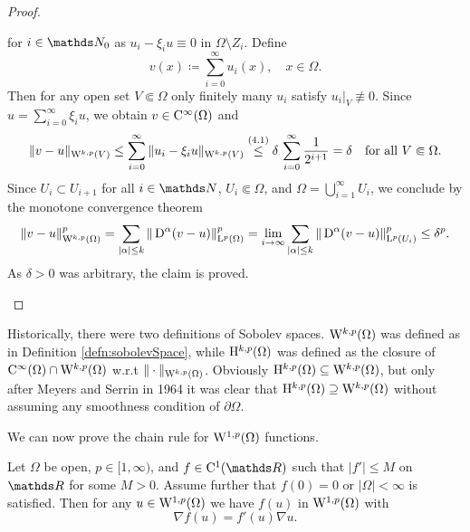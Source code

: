 \begin{proof}
\begin{enumerate}[i)]
\begin{equation}
    \end{equation}
    for $i \in \N_0$ as $u_i - \xi_i u \equiv 0$ in $\Omega \setminus Z_i$.
    Define
    $$
    v(x) \coloneqq \sum_{i = 0}^\infty u_i(x), \quad x \in \Omega.
    $$
    Then for any open set $V \Subset \Omega$ only finitely many $u_i$ satisfy $u_i|_V \not\equiv 0$.
    Since $u = \sum_{i = 0}^\infty \xi_i u$, we obtain $v \in \mathrm{C}^\infty(\Omega)$ and
    $$
    \|v - u\|_{\mathrm{W}^{k,p}(V)}
    \leq \sum_{i = 0}^\infty \|u_i - \xi_i u\|_{\mathrm{W}^{k,p}(V)}
    \overset{(4.1)}{\leq} \delta \, \sum_{i = 0}^\infty \frac{1}{2^{i + 1}} 
    = \delta \quad\text{for all } V \Subset \Omega.
    $$
    Since $U_i \subset U_{i + 1}$ for all $i \in \N$, $U_i \Subset \Omega$, and $\Omega = \bigcup_{i = 1}^\infty U_i$, we conclude by the monotone convergence theorem
    $$
    \|v - u\|_{\mathrm{W}^{k,p}(\Omega)}^p
    = \sum_{|\alpha| \leq k} \|\,{\operatorname{D}}^\alpha (v - u) \|_{\mathrm{L}^p(\Omega)}^p
    = \lim_{i \to \infty} \sum_{|\alpha| \leq k} \|\,{\operatorname{D}}^\alpha(v - u) \|_{\mathrm{L}^p(U_i)}^p
    \leq \delta^p.
    $$
    As $\delta > 0$ was arbitrary, the claim is proved. \qedhere
\end{enumerate}
\end{proof}

\begin{rem}
  Historically, there were two definitions of Sobolev spaces.
  $\mathrm{W}^{k,p}(\Omega)$ was defined as in Definition \ref{defn:sobolevSpace}, while $\mathrm{H}^{k,p}(\Omega)$ was defined as the closure of $\mathrm{C}^\infty(\Omega) \cap \mathrm{W}^{k,p}(\Omega)$ w.r.t $\|\cdot\|_{\mathrm{W}^{k,p}(\Omega)}$.
  Obviously $\mathrm{H}^{k,p}(\Omega) \subseteq \mathrm{W}^{k,p}(\Omega)$, but only after Meyers and Serrin in 1964 \cite{meyers1964} it was clear that $\mathrm{H}^{k,p}(\Omega) \supseteq \mathrm{W}^{k,p}(\Omega)$ without assuming any smoothness condition of $\partial \Omega$.
\end{rem}

We can now prove the chain rule for $\mathrm{W}^{1,p}(\Omega)$ functions.

\begin{prop}
  \label{prop:sobolevChainrule}
  Let $\Omega$ be open, $p \in [1,\infty)$, and $f \in \CC^1(\R)$ such that $|f'| \leq M$ on $\R$ for some $M > 0$.
  Assume further that $f(0) = 0$ or $|\Omega| < \infty$ is satisfied.
  Then for any $u \in \mathrm{W}^{1,p}(\Omega)$ we have $f(u)$ in $\mathrm{W}^{1,p}(\Omega)$ with $$\nabla f(u) = f'(u) \nabla u.$$
\end{prop}

